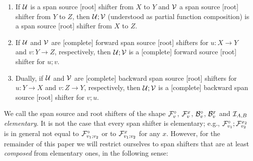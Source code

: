 \begin{fullorname}
\begin{proposition}
\begin{enumerate}[topsep=\smallskipamount]
\item If $\cU$ is a span source [root] shifter from $X$ to $Y$ and $\cV$ a span source [root] shifter from $Y$ to $Z$, then $\cU;\cV$ (understood as partial function composition) is a span source [root] shifter from $X$ to $Z$. 
\item If $\cU$ and $\cV$ are [complete] forward span source [root] shifters for $u: X\to Y$ and $v: Y \to Z$, respectively, then $\cU;\cV$ is a [complete] forward source [root] shifter for $u;v$.
\item Dually, if $\cU$ and $\cV$ are [complete] backward span source [root] shifters for $u: Y\to X$ and $v: Z \to Y$, respectively, then $\cU;\cV$ is a [complete] backward span source [root] shifter for $v;u$.
\end{enumerate}
\end{proposition}
\end{fullorname}
%
\begin{comment}
\medskip\noindent
In fact we also need the following auxiliary composition property for direct span shifters.\todo{AR: Added AC: ok} This immediately follows from the associativity of span composition combined with the fact that spans with identity left-legs and identity right-legs compose; we omit the proof.

\begin{lemma}[direct span shifters compose]\llabel{direct sb-shifters compose}
Let $t:A\to B,v:B\to C$ be arrows; then
\begin{enumerate*}[topsep=\smallskipamount]
\item $\dF t;\dF v=\dF{t;v}$, and 
\item $\dB v;\dB t=\dB{t;v}$.
\end{enumerate*}
\end{lemma}
\end{comment}
%
We call the span source and root shifters of the shape $\dF v$, $\rF v x$, $\dB v$, $\rB v x$ and $\cI_{A,B}$ \emph{elementary}. It is not the case that every span shifter is elementary; e.g., $\dF{v_1};\rF{v_2}{x_2}$ is in general not equal to $\dF{v_1;v_2}$ or to $\rF{v_1;v_2} x$ for any $x$. However, for the remainder of this paper we will restrict ourselves to span shifters that are at least \emph{composed} from elementary ones, in the following sense:

